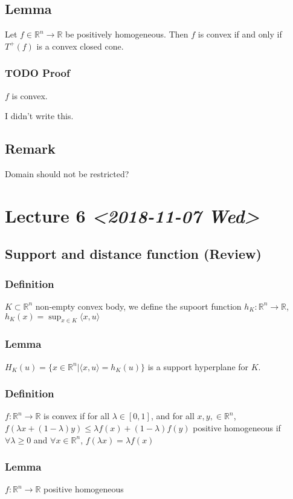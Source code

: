 \documentclass[11pt]{article}
\def\R{\mathbb{R}}
\begin{document}
\subsection{Lemma}
\label{sec:org7454bf4}
Let \(f\in \R^n \rightarrow \R\) be positively homogeneous. Then \(f\) is convex
if and only if \(T^{+}(f)\) is a convex closed cone.
\subsubsection{{\bfseries\sffamily TODO} Proof}
\label{sec:orgec854cf}
\(f\) is convex.

I didn't write this.
\subsection{Remark}
\label{sec:org162c4e4}
Domain should not be restricted? 
\section{Lecture 6 \textit{<2018-11-07 Wed>}}
\label{sec:org982323d}
\subsection{Support and distance function (Review)}
\label{sec:org4f37698}
\subsubsection{Definition}
\label{sec:org89dda43}
\(K \subset \R^n\) non-empty convex body, we define the supoort function
\(h_K \colon \R^n \rightarrow \R\), \(h_K(x) = \sup_{x\in K} \langle x, u \rangle\)
\subsubsection{Lemma}
\label{sec:org7902ea4}
\(H_K(u) = \{x \in \R^n \vert \langle x , u \rangle = h_K(u)\}\) is a support
hyperplane for \(K\).
\subsubsection{Definition}
\label{sec:org34e6d05}
\(f\colon \R^n \rightarrow \R\) is convex if for all \(\lambda \in [0, 1]\), and
for all \(x, y, \in \R^n\), \(f(\lambda x + (1-\lambda)y) \le \lambda f(x) +
    (1-\lambda)f(y)\) positive homogeneous if \(\forall \lambda \ge 0\) and
\(\forall x \in \R^n\), \(f(\lambda x) = \lambda f(x)\)
\subsubsection{Lemma}
\label{sec:org5f2baa6}
\(f\colon \R^n \rightarrow \R\) positive homogeneous
\end{document}
